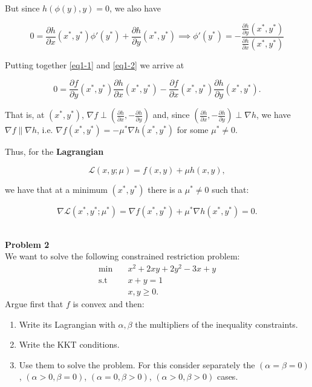 \documentclass[11pt,table]{article}
\newenvironment{problem}[2][Problem]
{ \begin{mdframed}[backgroundcolor=gray!20] \textbf{#1 #2} \\ }
	{  \end{mdframed} }
\begin{document}
	But since $h(\phi(y), y) = 0$, we also have
	
	\begin{equation}
		\label{eq1-2}
		0 = \frac{\partial h}{\partial x}(x^*, y^*)\phi'(y^*) + \frac{\partial h}{\partial y}(x^*, y^*) \implies \phi'(y^*) = -\frac{\frac{\partial h}{\partial y}(x^*, y^*)}{\frac{\partial h}{\partial x}(x^*, y^*)} 
	\end{equation}
	
	Putting together \ref{eq1-1} and \ref{eq1-2} we arrive at
	
	\[
	0 = \frac{\partial f}{\partial y}(x^*, y^*) \frac{\partial h}{\partial x}(x^*, y^*) - 
	\frac{\partial f}{\partial x}(x^*, y^*) \frac{\partial h}{\partial y}(x^*, y^*).
	\]
	
	That is, at $(x^*, y^*)$, $\nabla f \perp \left( \frac{\partial h}{\partial x}, -\frac{\partial h}{\partial y} \right)$ and, since $\left( \frac{\partial h}{\partial x}, -\frac{\partial h}{\partial y} \right) \perp \nabla h$, we have $\nabla f \parallel \nabla h$, i.e. $\nabla f(x^*, y^*) = - \mu^* \nabla h(x^*, y^*)$ for some $\mu^* \neq 0$.
	
	Thus, for the \textbf{Lagrangian}
	
	\[
	\mathcal L(x, y; \mu) = f(x,y) + \mu h(x,y),
	\]
	
	we have that at a minimum $(x^*, y^*)$ there is a $\mu^* \neq 0$ such that:
	
	\[
	\nabla \mathcal L(x^*, y^*; \mu^*) = \nabla f(x^*, y^*) + \mu^* \nabla h(x^*, y^*) = 0.
	\] \\
	
	\begin{problem}{2}
		We want to solve the following constrained restriction problem:
		\begin{align*}
			\min \quad       & x^{2} + 2xy + 2y^2 - 3x + y \\
			\text{s.t} \quad & x + y = 1            \\
			& x,y \geq 0.
		\end{align*}
		Argue first that \(f\) is convex and then:
		\begin{enumerate}
			\item Write its Lagrangian with \(\alpha,\beta\) the multipliers of the inequality constraints.
			\item Write the KKT conditions.
			\item Use them to solve the problem. For this consider separately the \((\alpha = \beta = 0)\), \((\alpha > 0, \beta = 0)\), \((\alpha = 0, \beta > 0)\), \((\alpha > 0, \beta > 0)\) cases.
		\end{enumerate}
	\end{problem}
	
\end{document}
